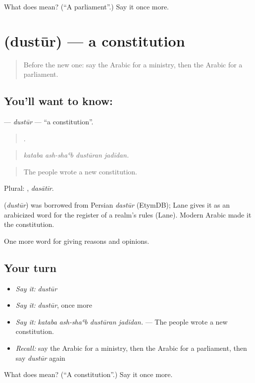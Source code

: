 \begin{tcolorbox}[breakable,colback=teal!4,colframe=teal!35!black,title={Before you move on}]
What does  mean? (\textquotedblleft{}A parliament\textquotedblright{}.) Say it once more.
\end{tcolorbox}
\section[\texorpdfstring{\ar{دستور} (dustūr)}{دستور (dustūr)}]{ (dustūr) — a constitution}

\label{lesson:AR-C377-dustur}



\begin{quote}
Before the new one: say the Arabic for a ministry, then the Arabic for a parliament.
\end{quote}

\subsection*{You'll want to know: }
\textbf{} — \emph{dustūr} — \textquotedblleft{}a constitution\textquotedblright{}.

\begin{quote}
   .
\end{quote}

\begin{quote}
\emph{kataba ash-shaʿb dustūran jadīdan.}
\end{quote}

\begin{quote}
The people wrote a new constitution.
\end{quote}

Plural: , \emph{dasātīr}.

\begin{cousinweb}
\textbf{} (\emph{dustūr}) was borrowed from Persian \emph{dastūr} (EtymDB); Lane gives it as an arabicized word for the register of a realm's rules (Lane). Modern Arabic made it the constitution.
\end{cousinweb}

\begin{grammarlens}[title={What you've built}]
One more word for giving reasons and opinions.
\end{grammarlens}

\subsection*{Your turn}
\begin{itemize}
\raggedright
  \item \emph{Say it:} \emph{dustūr}
  \item \emph{Say it:} \emph{dustūr}, once more
  \item \emph{Say it:} \emph{kataba ash-shaʿb dustūran jadīdan.} — The people wrote a new constitution.
  \item \emph{Recall:} say the Arabic for a ministry, then the Arabic for a parliament, then say \emph{dustūr} again
\end{itemize}

\begin{tcolorbox}[breakable,colback=teal!4,colframe=teal!35!black,title={Before you move on}]
What does  mean? (\textquotedblleft{}A constitution\textquotedblright{}.) Say it once more.
\end{tcolorbox}
